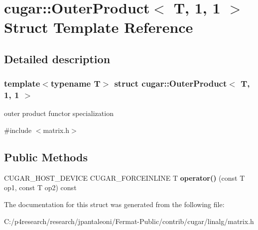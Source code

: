 \hypertarget{structcugar_1_1_outer_product_3_01_t_00_011_00_011_01_4}{}\section{cugar\+:\+:Outer\+Product$<$ T, 1, 1 $>$ Struct Template Reference}
\label{structcugar_1_1_outer_product_3_01_t_00_011_00_011_01_4}


\subsection{Detailed description}
\subsubsection*{template$<$typename T$>$\newline
struct cugar\+::\+Outer\+Product$<$ T, 1, 1 $>$}

outer product functor specialization 

{\ttfamily \#include $<$matrix.\+h$>$}

\subsection*{Public Methods}
\begin{DoxyCompactItemize}
\item 
\mbox{\label{structcugar_1_1_outer_product_3_01_t_00_011_00_011_01_4_acc91d0de7504b2fbdd63c326b811c078}} 
C\+U\+G\+A\+R\+\_\+\+H\+O\+S\+T\+\_\+\+D\+E\+V\+I\+CE C\+U\+G\+A\+R\+\_\+\+F\+O\+R\+C\+E\+I\+N\+L\+I\+NE T {\bfseries operator()} (const T op1, const T op2) const
\end{DoxyCompactItemize}


The documentation for this struct was generated from the following file\+:\begin{DoxyCompactItemize}
\item 
C\+:/p4research/research/jpantaleoni/\+Fermat-\/\+Public/contrib/cugar/linalg/matrix.\+h\end{DoxyCompactItemize}
